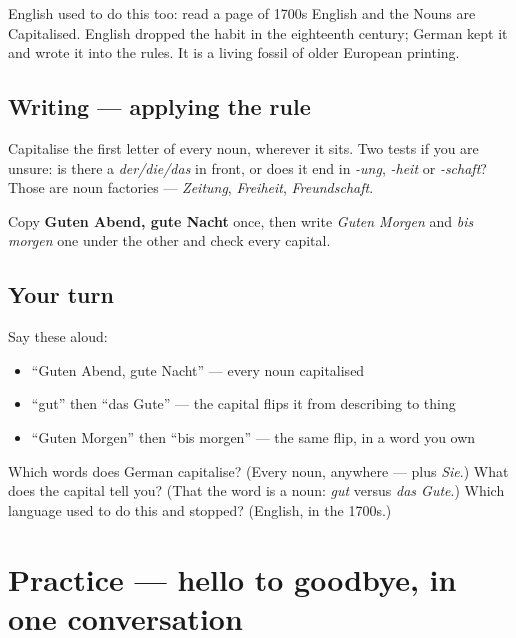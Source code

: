 \begin{culture}
English used to do this too: read a page of 1700s English and the Nouns are Capitalised. English dropped the habit in the eighteenth century; German kept it and wrote it into the rules. It is a living fossil of older European printing.
\end{culture}

\subsection*{Writing — applying the rule}
Capitalise the first letter of every noun, wherever it sits. Two tests if you are unsure: is there a \emph{der/die/das} in front, or does it end in \emph{-ung}, \emph{-heit} or \emph{-schaft}? Those are noun factories — \emph{Zeitung}, \emph{Freiheit}, \emph{Freundschaft}.

Copy \textbf{Guten Abend, gute Nacht} once, then write \emph{Guten Morgen} and \emph{bis morgen} one under the other and check every capital.

\subsection*{Your turn}
Say these aloud:

\begin{itemize}
\raggedright
  \item \textquotedblleft{}Guten Abend, gute Nacht\textquotedblright{} — every noun capitalised
  \item \textquotedblleft{}gut\textquotedblright{} then \textquotedblleft{}das Gute\textquotedblright{} — the capital flips it from describing to thing
  \item \textquotedblleft{}Guten Morgen\textquotedblright{} then \textquotedblleft{}bis morgen\textquotedblright{} — the same flip, in a word you own
\end{itemize}

\begin{tcolorbox}[breakable,colback=teal!4,colframe=teal!35!black,title={Before you move on}]
Which words does German capitalise? (Every noun, anywhere — plus \emph{Sie}.) What does the capital tell you? (That the word is a noun: \emph{gut} versus \emph{das Gute}.) Which language used to do this and stopped? (English, in the 1700s.)
\end{tcolorbox}
\section[Practice]{Practice — hello to goodbye, in one conversation}

